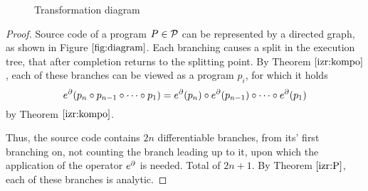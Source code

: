 \begin{figure}
\begin{center}
\caption{Transformation diagram} \label{fig:diagram}
\end{center}
\end{figure}


\begin{proof}
  Source code of a program $P\in\mathcal{P}$ can be represented by a directed graph, as shown in Figure $\ref{fig:diagram}$. Each branching causes a split in the execution tree, that after completion returns to the splitting point.
  By Theorem $\ref{izr:kompo}$, each of these branches can be viewed as a program $p_i$, for which it holds $$e^\partial(p_n\circ p_{n-1}\circ\cdots\circ p_1)=e^\partial(p_n)\circ e^\partial(p_{n-1})\circ\cdots\circ e^\partial(p_1)$$ by Theorem $\ref{izr:kompo}$.
  
  Thus, the source code contains $2n$ differentiable branches, from its' first branching on, not counting the branch leading up to it, upon which the application of the operator $e^\partial$ is needed. Total of $2n+1$. By Theorem $\ref{izr:P}$, each of these branches is analytic.
\end{proof}



